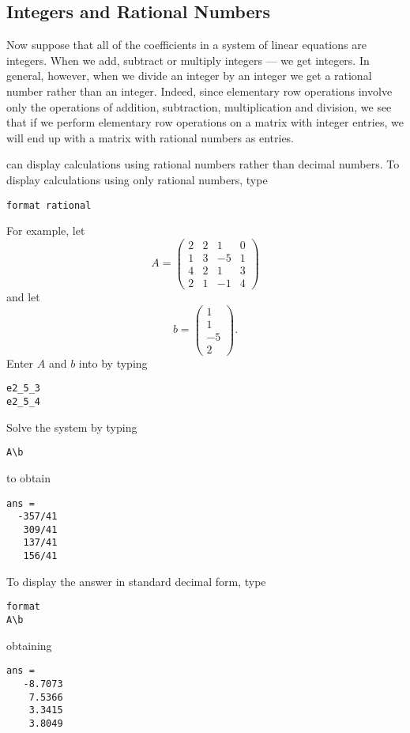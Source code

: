 \documentclass{ximera}
\begin{document}
\subsection*{Integers and Rational Numbers}

Now suppose that all of the coefficients in a system of linear
equations are integers.  When we add, subtract or multiply
integers --- we get integers.  In general, however, when we
divide an integer by an integer we get a rational number rather
than an integer.  Indeed, since elementary row operations
involve only the operations of addition, subtraction,
multiplication and division, we see that if we perform
elementary row operations on a matrix with integer entries, we
will end up with a matrix with rational numbers as entries.

\Matlab can display calculations using rational numbers rather
than decimal numbers.  To display calculations using only
rational numbers, type
\begin{verbatim}
format rational
\end{verbatim} 
For example, let
\begin{equation*} \label{e:A4}
A=\left(\begin{array}{ccrc} 2 & 2 & 1 & 0\\ 1 & 3 & -5 & 1\\
4 & 2 & 1 & 3 \\ 2 & 1 & -1 & 4\end{array}\right)
\end{equation*}
and let
\begin{equation*} \label{e:b4}
b=\left(\begin{array}{r} 1 \\ 1 \\ -5 \\2 \end{array} \right).
\end{equation*}
Enter $A$ and $b$ into \Matlab by typing
\begin{verbatim}
e2_5_3
e2_5_4
\end{verbatim}
Solve the system by typing
\begin{verbatim}
A\b
\end{verbatim}
to obtain
\begin{verbatim}
ans =
  -357/41
   309/41
   137/41
   156/41
\end{verbatim}
To display the answer in standard decimal form, type
\begin{verbatim}
format
A\b
\end{verbatim}
obtaining
\begin{verbatim}
ans =
   -8.7073
    7.5366
    3.3415
    3.8049
\end{verbatim}
\end{document}
